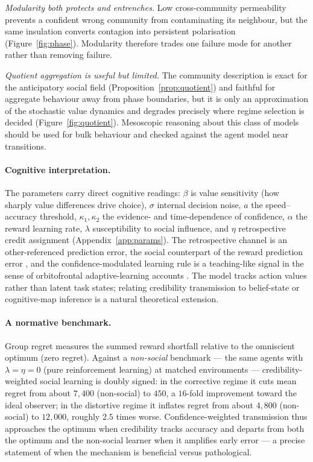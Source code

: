 \documentclass[11pt]{article}
\newcommand{\1}{\mathbf{1}}
\begin{document}
\emph{Modularity both protects and entrenches.} Low cross-community permeability
prevents a confident wrong community from contaminating its neighbour, but the
same insulation converts contagion into persistent polarisation
(Figure~\ref{fig:phase}). Modularity therefore trades one failure mode for
another rather than removing failure.

\emph{Quotient aggregation is useful but limited.} The community description is
exact for the anticipatory social field (Proposition~\ref{prop:quotient}) and
faithful for aggregate behaviour away from phase boundaries, but it is only an
approximation of the stochastic value dynamics and degrades precisely where
regime selection is decided (Figure~\ref{fig:quotient}). Mesoscopic reasoning
about this class of models should be used for bulk behaviour and checked against
the agent model near transitions.

\paragraph{Cognitive interpretation.}
The parameters carry direct cognitive readings: $\beta$ is value sensitivity
(how sharply value differences drive choice), $\sigma$ internal decision noise,
$a$ the speed--accuracy threshold, $\kappa_1,\kappa_2$ the evidence- and
time-dependence of confidence, $\alpha$ the reward learning rate, $\lambda$
susceptibility to social influence, and $\eta$ retrospective credit assignment
(Appendix~\ref{app:params}). The retrospective channel is an other-referenced
prediction error, the social counterpart of the reward prediction error
\citep{JoinerPivaTurrinChang2017}, and the confidence-modulated learning rule is
a teaching-like signal in the sense of orbitofrontal adaptive-learning accounts
\citep{SchuckCaiWilsonNiv2016,Niv2019,WangVeismannBanerjeePleger2023}. The model
tracks action values rather than latent task states; relating credibility
transmission to belief-state or cognitive-map inference
\citep{Niv2019,BehrensMullerWhittingtonMarkSchultzeDolanKurthNelson2018} is a
natural theoretical extension.

\paragraph{A normative benchmark.}
Group regret measures the summed reward shortfall relative to the omniscient
optimum (zero regret). Against a \emph{non-social} benchmark --- the same agents
with $\lambda=\eta=0$ (pure reinforcement learning) at matched environments ---
credibility-weighted social learning is doubly signed: in the corrective regime
it cuts mean regret from about $7{,}400$ (non-social) to $450$, a $16$-fold
improvement toward the ideal observer; in the distortive regime it inflates
regret from about $4{,}800$ (non-social) to $12{,}000$, roughly $2.5$ times
worse. Confidence-weighted transmission thus approaches the optimum when
credibility tracks accuracy and departs from both the optimum and the non-social
learner when it amplifies early error --- a precise statement of when the
mechanism is beneficial versus pathological.
\end{document}
